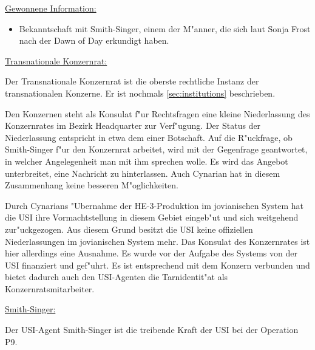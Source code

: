 \begin{remarks}
	\underline{Gewonnene Information:}
	
	\begin{itemize}
		\item Bekanntschaft mit Smith-Singer, einem der M"anner, die sich laut Sonja Frost nach der Dawn of Day erkundigt haben.
	\end{itemize}

	\underline{Transnationale Konzernrat:}

	Der Transnationale Konzernrat ist die oberste rechtliche Instanz der transnationalen Konzerne. Er ist nochmals \cref{sec:institutions} beschrieben.

	Den Konzernen steht als Konsulat f"ur Rechtsfragen eine kleine Niederlassung des Konzernrates im Bezirk Headquarter zur Verf"ugung. Der Status der Niederlassung entspricht in etwa dem einer Botschaft. Auf die R"uckfrage, ob Smith-Singer f"ur den Konzernrat arbeitet, wird mit der Gegenfrage geantwortet, in welcher Angelegenheit man mit ihm sprechen wolle. Es wird das Angebot unterbreitet, eine Nachricht zu hinterlassen. Auch Cynarian hat in diesem Zusammenhang keine besseren M"oglichkeiten.
	
	Durch Cynarians "Ubernahme der HE-3-Produktion im jovianischen System hat die USI ihre Vormachtstellung in diesem Gebiet eingeb"u\3t und sich weitgehend zur"uckgezogen. Aus diesem Grund besitzt die USI keine offiziellen Niederlassungen im jovianischen System mehr. Das Konsulat des Konzernrates ist hier allerdings eine Ausnahme. Es wurde vor der Aufgabe des Systems von der USI finanziert und gef"uhrt. Es ist entsprechend mit dem Konzern verbunden und bietet dadurch auch den USI-Agenten die Tarnidentit"at als Konzernratsmitarbeiter.

	\underline{Smith-Singer:}

	Der USI-Agent Smith-Singer ist die treibende Kraft der USI bei der Operation P9.
\end{remarks}

